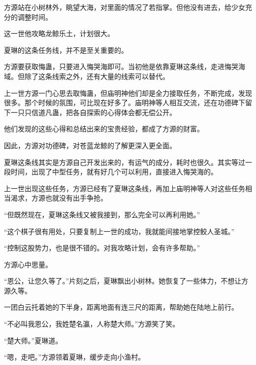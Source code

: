 \begin{this_body}
方源站在小树林外，眺望大海，对里面的情况了若指掌。但他没有进去，给少女充分的调整时间。

这一世他攻略龙鲸乐土，计划很大。

夏琳的这条任务线，并不是至关重要的。

方源要获取悔蛊，只要进入悔哭海即可。当初他是依靠夏琳这条线，走进悔哭海域。但除了这条线索之外，还有大量的线索可以替代。

上一世方源一门心思去取悔蛊，但庙明神他们却是全力接取任务，不断完成，发现很多。那个时候的氛围，可比现在好多了。庙明神等人相互交流，还在功德碑下留下一只只信道凡蛊，把各自探索的心得体会都无偿公开。

他们发现的这些心得和总结出来的宝贵经验，都成了方源的财富。

因此，方源对功德碑，对苍蓝龙鲸的了解更深入更全面。

夏琳这条线其实是方源自己开发出来的，有运气的成分，耗时也很久。其实等过一段时间，出现了中型任务，就有好几个可以利用，直接进入悔哭海的。

上一世出现这些任务，方源已经有了夏琳这条线，再加上庙明神等人对这些任务相当渴求，方源也就没有出手争抢。

“但既然现在，夏琳这条线又被我接到，那么完全可以再利用她。”

“这个棋子很有用处，只要复制上一世的成功，我就能间接地掌控鲛人圣城。”

“控制这股势力，也是很不错的。对我攻略计划，会有许多帮助。”

方源心中思量。

“恩公，让您久等了。”片刻之后，夏琳飘出小树林。她恢复了一些体力，不想让方源久等。

一团白云托着她的下半身，距离地面有连三尺的距离，帮助她在陆地上前行。

“不必叫我恩公，我姓楚名瀛，人称楚大师。”方源笑了笑。

“楚大师。”夏琳道。

“嗯，走吧。”方源领着夏琳，缓步走向小渔村。

\end{this_body}

